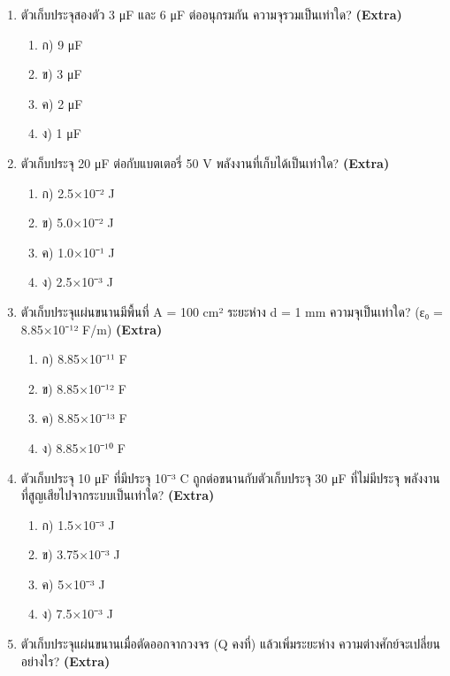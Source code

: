 \documentclass[12pt]{article}
\begin{document}
\begin{enumerate}[label=\arabic*.]
\begin{enumerate}[label=)]
\item ก) 2 V
\item ข) 4 V
\item ค) 8 V
\item ง) 12 V
\end{enumerate}
\item ตัวเก็บประจุสองตัว 3 μF และ 6 μF ต่ออนุกรมกัน ความจุรวมเป็นเท่าใด? \hfill \textbf{\small (Extra)}
\begin{enumerate}[label=)]
\item ก) 9 μF
\item ข) 3 μF
\item ค) 2 μF
\item ง) 1 μF
\end{enumerate}
\item ตัวเก็บประจุ 20 μF ต่อกับแบตเตอรี่ 50 V พลังงานที่เก็บได้เป็นเท่าใด? \hfill \textbf{\small (Extra)}
\begin{enumerate}[label=)]
\item ก) 2.5×10⁻² J
\item ข) 5.0×10⁻² J
\item ค) 1.0×10⁻¹ J
\item ง) 2.5×10⁻³ J
\end{enumerate}
\item ตัวเก็บประจุแผ่นขนานมีพื้นที่ A = 100 cm² ระยะห่าง d = 1 mm ความจุเป็นเท่าใด? (ε₀ = 8.85×10⁻¹² F/m) \hfill \textbf{\small (Extra)}
\begin{enumerate}[label=)]
\item ก) 8.85×10⁻¹¹ F
\item ข) 8.85×10⁻¹² F
\item ค) 8.85×10⁻¹³ F
\item ง) 8.85×10⁻¹⁰ F
\end{enumerate}
\item ตัวเก็บประจุ 10 μF ที่มีประจุ 10⁻³ C ถูกต่อขนานกับตัวเก็บประจุ 30 μF ที่ไม่มีประจุ พลังงานที่สูญเสียไปจากระบบเป็นเท่าใด? \hfill \textbf{\small (Extra)}
\begin{enumerate}[label=)]
\item ก) 1.5×10⁻³ J
\item ข) 3.75×10⁻³ J
\item ค) 5×10⁻³ J
\item ง) 7.5×10⁻³ J
\end{enumerate}
\item ตัวเก็บประจุแผ่นขนานเมื่อตัดออกจากวงจร (Q คงที่) แล้วเพิ่มระยะห่าง ความต่างศักย์จะเปลี่ยนอย่างไร? \hfill \textbf{\small (Extra)}

\end{enumerate}
\end{document}
